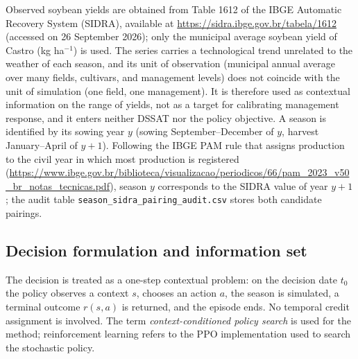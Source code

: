 \documentclass[times,final,authoryear]{elsarticle}
\begin{document}
Observed soybean yields are obtained from Table 1612 of the IBGE Automatic Recovery System (SIDRA), available at \url{https://sidra.ibge.gov.br/tabela/1612} (accessed on 26 September 2026); only the municipal average soybean yield of Castro (kg ha$^{-1}$) is used. The series carries a technological trend unrelated to the weather of each season, and its unit of observation (municipal annual average over many fields, cultivars, and management levels) does not coincide with the unit of simulation (one field, one management). It is therefore used as contextual information on the range of yields, not as a target for calibrating management response, and it enters neither DSSAT nor the policy objective. A season is identified by its sowing year $y$ (sowing September--December of $y$, harvest January--April of $y+1$). Following the IBGE PAM rule that assigns production to the civil year in which most production is registered (\url{https://www.ibge.gov.br/biblioteca/visualizacao/periodicos/66/pam_2023_v50_br_notas_tecnicas.pdf}), season $y$ corresponds to the SIDRA value of year $y+1$; the audit table \texttt{season\_sidra\_pairing\_audit.csv} stores both candidate pairings.

\subsection{Decision formulation and information set}
\label{subdecision}

The decision is treated as a one-step contextual problem: on the decision date $t_0$ the policy observes a context $s$, chooses an action $a$, the season is simulated, a terminal outcome $r(s,a)$ is returned, and the episode ends. No temporal credit assignment is involved. The term \emph{context-conditioned policy search} is used for the method; reinforcement learning refers to the PPO implementation used to search the stochastic policy.
\end{document}
